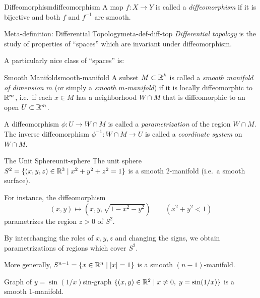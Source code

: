 \begin{definition}{Diffeomorphism}{diffeomorphism}
    A map $f \colon X \to Y$ is called a \emph{diffeomorphism} if it is bijective and both $f$ and $f^{-1}$ are smooth.
\end{definition}

\begin{remark}{Meta-definition: Differential Topology}{meta-def-diff-top}
    \emph{Differential topology} is the study of properties of ``spaces'' which are invariant under diffeomorphism.
\end{remark}

A particularly nice class of ``spaces'' is:

\begin{definition}{Smooth Manifold}{smooth-manifold}
    A subset $M \subset \mathbb{R}^k$ is called a \emph{smooth manifold of dimension $m$} (or simply a \emph{smooth $m$-manifold}) if it is locally diffeomorphic to $\mathbb{R}^m$, i.e.\ if each $x \in M$ has a neighborhood $W \cap M$ that is diffeomorphic to an open $U \subset \mathbb{R}^m$.

    A diffeomorphism $\phi \colon U \to W \cap M$ is called a \emph{parametrization} of the region $W \cap M$. The inverse diffeomorphism $\phi^{-1} \colon W \cap M \to U$ is called a \emph{coordinate system} on $W \cap M$.
\end{definition}

\begin{example}{The Unit Sphere}{unit-sphere}
    The unit sphere $S^2 = \{(x,y,z) \in \mathbb{R}^3 \mid x^2 + y^2 + z^2 = 1\}$ is a smooth 2-manifold (i.e.\ a smooth surface).

    For instance, the diffeomorphism
    \[
        (x,y) \mapsto (x, y, \sqrt{1 - x^2 - y^2}) \qquad (x^2 + y^2 < 1)
    \]
    parametrizes the region $z > 0$ of $S^2$.

    By interchanging the roles of $x, y, z$ and changing the signs, we obtain parametrizations of regions which cover $S^2$.

    More generally, $S^{n-1} = \{x \in \mathbb{R}^n \mid |x| = 1\}$ is a smooth $(n-1)$-manifold.
\end{example}

\begin{example}{Graph of $y = \sin(1/x)$}{sin-graph}
    $\{(x,y) \in \mathbb{R}^2 \mid x \neq 0,\; y = \sin(1/x)\}$ is a smooth 1-manifold.
\end{example}

\begin{center}
\end{center}

